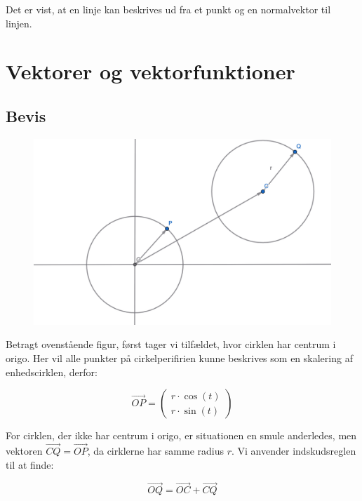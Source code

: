 \documentclass{article}
\makeatletter
\newenvironment{proofw}{\par
  \pushQED{\qed}%
  \normalfont \topsep6\p@\@plus6\p@\relax
  \trivlist
  \item[]\ignorespaces
}{%
  \popQED\endtrivlist\@endpefalse
}
\makeatother
\begin{document}
\begin{proofw}
    Det er vist, at en linje kan beskrives ud fra et punkt og en normalvektor til linjen.

\end{proofw}

\section{Vektorer og vektorfunktioner}

\subsection{Bevis}

\begin{proofw}
    \begin{figure}[h]
        \centering
        \includegraphics[scale=0.3]{skitser/cirkel.png}
    \end{figure}

    Betragt ovenstående figur, først tager vi tilfældet,
    hvor cirklen har centrum i origo. Her vil alle punkter
    på cirkelperifirien kunne beskrives som en skalering af enhedscirklen, derfor:

    $$
        \vec{OP}=\begin{pmatrix}
            r\cdot \cos(t)
            \\
            r\cdot \sin(t)
        \end{pmatrix}
    $$
    
    For cirklen, der ikke har centrum i origo, er situationen en smule anderledes,
    men vektoren $\vec{CQ}=\vec{OP}$, da cirklerne har samme radius $r$.
    Vi anvender indskudsreglen til at finde:

    $$
        \vec{OQ}=\vec{OC}+\vec{CQ}
    $$


\end{proofw}
\end{document}
